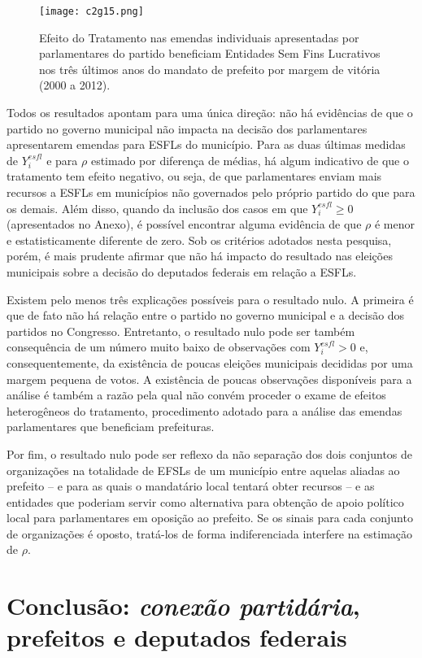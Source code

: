 \begin{figure}[htp]
	\centering
	\texttt{[image: c2g15.png]}
		\caption{Efeito do Tratamento nas emendas individuais apresentadas por parlamentares do partido beneficiam Entidades Sem Fins Lucrativos nos três últimos anos do mandato de prefeito por margem de vitória (2000 a 2012).}
	\label{fig:c2g15}
\end{figure}

Todos os resultados apontam para uma única direção: não há evidências de que o partido no governo municipal não impacta na decisão dos parlamentares apresentarem emendas para ESFLs do município. Para as duas últimas medidas de $Y_{i}^{esfl}$ e para $\rho$ estimado por diferença de médias, há algum indicativo de que o tratamento tem efeito negativo, ou seja, de que parlamentares enviam mais recursos a ESFLs em municípios não governados pelo próprio partido do que para os demais. Além disso, quando da inclusão dos casos em que $Y_{i}^{esfl} \geq 0$ (apresentados no Anexo), é possível encontrar alguma evidência de que $\rho$ é menor e estatisticamente diferente de zero. Sob os critérios adotados nesta pesquisa, porém, é mais prudente afirmar que não há impacto do resultado nas eleições municipais sobre a decisão do deputados federais em relação a ESFLs.

Existem pelo menos três explicações possíveis para o resultado nulo. A primeira é que de fato não há relação entre o partido no governo municipal e a decisão dos partidos no Congresso. Entretanto, o resultado nulo pode ser também consequência de um número muito baixo de observações com $Y_{i}^{esfl}>0$ e, consequentemente, da existência de poucas eleições municipais decididas por uma margem pequena de votos. A existência de poucas observações disponíveis para a análise é também a razão pela qual não convém proceder o exame de efeitos heterogêneos do tratamento, procedimento adotado para a análise das emendas parlamentares que beneficiam prefeituras.

Por fim, o resultado nulo pode ser reflexo da não separação dos dois conjuntos de organizações na totalidade de EFSLs de um município entre aquelas aliadas ao prefeito -- e para as quais o mandatário local tentará obter recursos -- e as entidades que poderiam servir como alternativa para obtenção de apoio político local para parlamentares em oposição ao prefeito. Se os sinais para cada conjunto de organizações é oposto, tratá-los de forma indiferenciada interfere na estimação de $\rho$.

\section{Conclusão: \emph{conexão partidária}, prefeitos e deputados federais}

